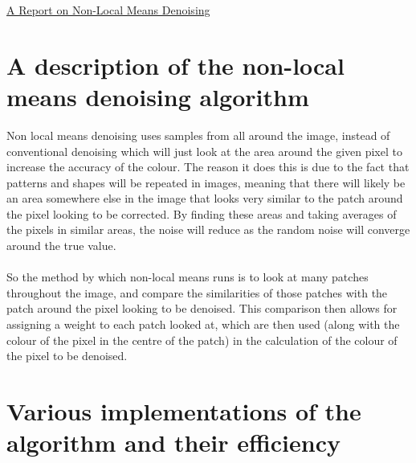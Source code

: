 \documentclass[11pt]{article}
\begin{document}
\begin{center}
\underline{\huge A Report on Non-Local Means Denoising}
\end{center}
\section{A description of the non-local means denoising algorithm}
\cite{schmid_cvpr_2005} Non local means denoising uses samples from all around the image, instead of conventional denoising which will just look at the area around the given pixel to increase the accuracy of the colour. The reason it does this is due to the fact that patterns and shapes will be repeated in images, meaning that there will likely be an area somewhere else in the image that looks very similar to the patch around the pixel looking to be corrected. By finding these areas and taking averages of the pixels in similar areas, the noise will reduce as the random noise will converge around the true value.\\
\\
 So the method by which non-local means runs is to look at many patches throughout the image, and compare the similarities of those patches with the patch around the pixel looking to be denoised. This comparison then allows for assigning a weight to each patch looked at, which are then used (along with the colour of the pixel in the centre of the patch) in the calculation of the colour of the pixel to be denoised.

\section{Various implementations of the algorithm and their efficiency}
\end{document}
